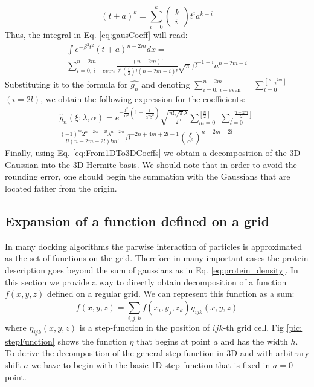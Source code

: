 \begin{equation}
(t+a)^{k}=\sum_{i=0}^{k}\left(\begin{array}{c}
k\\
i
\end{array} \right)t^{i}a^{k-i}
\end{equation}
%
Thus, the integral in Eq. \ref{eq:gausCoeff} will read:
%
\begin{eqnarray}
\int e^{-\beta^{2}t^{2}}(t+a)^{n-2m}dx =  \nonumber \\ \sum_{i=0,\, i-even}^{n-2m}\frac{(n-2m)!}{2^{i}\left(\frac{i}{2}\right)!(n-2m-i)!}\sqrt{\pi}\beta^{-1-i}a^{n-2m-i}
\end{eqnarray}
Substituting it to the formula for $\hat{g_{n}}$ and denoting $\sum_{i=0,\, i-\textrm{even
}}^{n-2m}=\sum_{l=0}^{[\frac{n-2m}{2}]}$  $(i=2l)$,
we obtain the following expression for the coefficients:
%
\begin{eqnarray}
\hat{g}_{n}(\xi;\lambda,\alpha)=e^{-\frac{\xi^{2}}{\alpha^2}\left(1-\frac{1}{\alpha^{2}\beta^{2}}\right)}\sqrt{\frac{n!\sqrt{\pi}\lambda}{2^{n}}}\sum_{m=0}^{[\frac{n}{2}]}\,\,\sum_{l=0}^{[\frac{n-2m}{2}]}  \nonumber \\
\frac{(-1)^{m}2^{n-2m-2l}\lambda^{n-2m}}{l!(n-2m-2l)!m!}\beta^{-2n+4m+2l-1}\left(\frac{\xi}{\alpha^{2}}\right)^{n-2m-2l}\label{eq:Gaussian1DDecCoefs}
\end{eqnarray}
Finally, using Eq. \ref{eq:From1DTo3DCoeffs} we obtain a decomposition
of the 3D Gaussian into the 3D Hermite basis. We should note that
in order to avoid the rounding error, one should begin the summation
with the Gaussians that are located father from the origin.

\subsection{Expansion of a function defined on a grid}
In many docking algorithms the parwise interaction of particles is approximated as the set of functions on the grid. Therefore in many important cases the protein description goes beyond 
the sum of gaussians as in Eq. \ref{eq:protein_density}. In this section we provide a way to directly obtain decomposition of a function $f(x,y,z)$ defined on a regular grid. We can represent this 
function as a sum:
$$ f(x,y,z) = \sum_{i,j,k} f(x_i,y_j,z_k) \eta_{ijk}(x,y,z)$$
where $\eta_{ijk}(x,y,z)$ is a step-function in the position of $ijk$-th grid cell. Fig \ref{pic: stepFunction} shows the function $\eta$ that begins at point $a$ and has the width $h$.
To derive the decomposition of the general step-function in 3D and with arbitrary shift $a$ we have to begin with the basic 1D step-function that is fixed in $a=0$ point.

